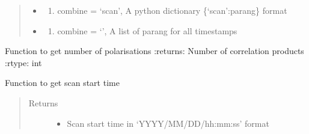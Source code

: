 \documentclass[letterpaper,10pt,english]{sphinxmanual}
\begin{document}
\begin{fulllineitems}
\begin{fulllineitems}
\begin{quote}
\begin{description}
\begin{itemize}
\begin{enumerate}
\end{enumerate}

\item {} 
\sphinxAtStartPar
{} \textendash{}
\begin{enumerate}
%
\setcounter{enumi}{1}
\item {} 
\sphinxAtStartPar
combine = ‘scan’, A python dictionary \{‘scan’:parang\} format

\end{enumerate}

\item {} 
\sphinxAtStartPar
{} \textendash{}
\begin{enumerate}
%
\setcounter{enumi}{2}
\item {} 
\sphinxAtStartPar
combine = ‘’, A list of parang for all timestamps

\end{enumerate}

\end{itemize}


\end{description}\end{quote}

\end{fulllineitems}


\begin{fulllineitems}
\label{\detokenize{paircars:paircars.access_ms.AccessMS.get_pol}}
\sphinxAtStartPar
Function to get number of polarisations
:returns: Number of correlation products
:rtype: int

\end{fulllineitems}


\begin{fulllineitems}
\label{\detokenize{paircars:paircars.access_ms.AccessMS.get_scan_startend_time}}
\sphinxAtStartPar
Function to get scan start time
\begin{quote}\begin{description}
\item[{Returns}] \leavevmode
\sphinxAtStartPar
\begin{itemize}
\item {} 
\sphinxAtStartPar
{} \textendash{} Scan start time in ‘YYYY/MM/DD/hh:mm:ss’ format


\end{itemize}
\end{description}
\end{quote}
\end{fulllineitems}
\end{fulllineitems}
\end{document}
